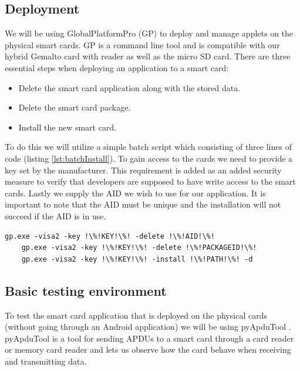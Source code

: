 \subsection{Deployment}
We will be using GlobalPlatformPro (GP) \cite{globalplatform} to deploy and manage applets on the physical smart cards. GP is a command line tool and is compatible with our hybrid Gemalto card with reader as well as the micro SD card. There are three essential steps when deploying an application to a smart card:

\begin{itemize}
    \item Delete the smart card application along with the stored data.
    \item Delete the smart card package.
    \item Install the new smart card.
\end{itemize}

To do this we will utilize a simple batch script which consisting of three lines of code (listing \ref{lst:batchInstall}). To gain access to the cards we need to provide a key set by the manufacturer. This requirement is added as an added security measure to verify that developers are supposed to have write access to the smart cards. Lastly we supply the AID we wish to use for our application. It is important to note that the AID must be unique and the installation will not succeed if the AID is in use.

\begin{lstlisting}[language=batch,caption=Install and deploy script for GlobalPlatformPro., label=lst:batchInstall,escapechar=!]
    gp.exe -visa2 -key !\%!KEY!\%! -delete !\%!AID!\%!
    gp.exe -visa2 -key !\%!KEY!\%! -delete !\%!PACKAGEID!\%!
    gp.exe -visa2 -key !\%!KEY!\%! -install !\%!PATH!\%! -d
\end{lstlisting}

\subsection{Basic testing environment}
To test the smart card application that is deployed on the physical cards (without going through an Android application) we will be using pyApduTool \cite{pyapdutool}. pyApduTool is a tool for sending APDUs to a smart card through a card reader or memory card reader and lets us observe how the card behave when receiving and transmitting data.

